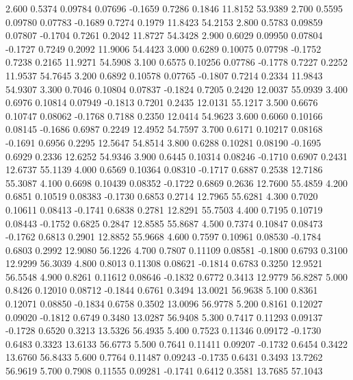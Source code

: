    2.600   0.5374   0.09784   0.07696  -0.1659   0.7286   0.1846  11.8152  53.9389
   2.700   0.5595   0.09780   0.07783  -0.1689   0.7274   0.1979  11.8423  54.2153
   2.800   0.5783   0.09859   0.07807  -0.1704   0.7261   0.2042  11.8727  54.3428
   2.900   0.6029   0.09950   0.07804  -0.1727   0.7249   0.2092  11.9006  54.4423
   3.000   0.6289   0.10075   0.07798  -0.1752   0.7238   0.2165  11.9271  54.5908
   3.100   0.6575   0.10256   0.07786  -0.1778   0.7227   0.2252  11.9537  54.7645
   3.200   0.6892   0.10578   0.07765  -0.1807   0.7214   0.2334  11.9843  54.9307
   3.300   0.7046   0.10804   0.07837  -0.1824   0.7205   0.2420  12.0037  55.0939
   3.400   0.6976   0.10814   0.07949  -0.1813   0.7201   0.2435  12.0131  55.1217
   3.500   0.6676   0.10747   0.08062  -0.1768   0.7188   0.2350  12.0414  54.9623
   3.600   0.6060   0.10166   0.08145  -0.1686   0.6987   0.2249  12.4952  54.7597
   3.700   0.6171   0.10217   0.08168  -0.1691   0.6956   0.2295  12.5647  54.8514
   3.800   0.6288   0.10281   0.08190  -0.1695   0.6929   0.2336  12.6252  54.9346
   3.900   0.6445   0.10314   0.08246  -0.1710   0.6907   0.2431  12.6737  55.1139
   4.000   0.6569   0.10364   0.08310  -0.1717   0.6887   0.2538  12.7186  55.3087
   4.100   0.6698   0.10439   0.08352  -0.1722   0.6869   0.2636  12.7600  55.4859
   4.200   0.6851   0.10519   0.08383  -0.1730   0.6853   0.2714  12.7965  55.6281
   4.300   0.7020   0.10611   0.08413  -0.1741   0.6838   0.2781  12.8291  55.7503
   4.400   0.7195   0.10719   0.08443  -0.1752   0.6825   0.2847  12.8585  55.8687
   4.500   0.7374   0.10847   0.08473  -0.1762   0.6813   0.2901  12.8852  55.9668
   4.600   0.7597   0.10961   0.08530  -0.1784   0.6803   0.2992  12.9080  56.1226
   4.700   0.7807   0.11109   0.08581  -0.1800   0.6793   0.3100  12.9299  56.3039
   4.800   0.8013   0.11308   0.08621  -0.1814   0.6783   0.3250  12.9521  56.5548
   4.900   0.8261   0.11612   0.08646  -0.1832   0.6772   0.3413  12.9779  56.8287
   5.000   0.8426   0.12010   0.08712  -0.1844   0.6761   0.3494  13.0021  56.9638
   5.100   0.8361   0.12071   0.08850  -0.1834   0.6758   0.3502  13.0096  56.9778
   5.200   0.8161   0.12027   0.09020  -0.1812   0.6749   0.3480  13.0287  56.9408
   5.300   0.7417   0.11293   0.09137  -0.1728   0.6520   0.3213  13.5326  56.4935
   5.400   0.7523   0.11346   0.09172  -0.1730   0.6483   0.3323  13.6133  56.6773
   5.500   0.7641   0.11411   0.09207  -0.1732   0.6454   0.3422  13.6760  56.8433
   5.600   0.7764   0.11487   0.09243  -0.1735   0.6431   0.3493  13.7262  56.9619
   5.700   0.7908   0.11555   0.09281  -0.1741   0.6412   0.3581  13.7685  57.1043
